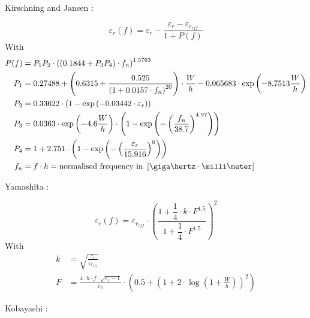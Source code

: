 \documentclass[10pt]{report}
\begin{document}
Kirschning and Jansen \cite{Kirschning3}:

\begin{equation}
\varepsilon_{r}(f) = \varepsilon_{r} - \frac{\varepsilon_{r} - \varepsilon_{r_{eff}}}{1 + P(f)}
\end{equation}
With
\begin{align}
P(f) &= P_{1} P_{2} \cdot\left(\left(0.1844 + P_{3} P_{4}\right) \cdot f_{n}\right)^{1.5763}\\
P_{1} &= 0.27488 + \left(0.6315 + \frac{0.525}{\left(1 + 0.0157\cdot f_{n}\right)^{20}}\right)\cdot \frac{W}{h} - 0.065683 \cdot \exp\left(-8.7513\dfrac{W}{h}\right)\\
P_{2} &= 0.33622\cdot \left(1 - \exp\left(-0.03442 \cdot \varepsilon_{r}\right)\right)\\
P_{3} &= 0.0363 \cdot \exp\left(-4.6\dfrac{W}{h}\right) \cdot \left(1 - \exp\left(- \left(\dfrac{f_{n}}{38.7}\right)^{4.97}\right)\right)\\
P_{4} &= 1 + 2.751 \cdot \left(1 - \exp\left(- \left(\frac{\varepsilon_{r}}{15.916}\right)^{8}\right)\right)\\
f_{n} &= f \cdot h = \text{normalised frequency in } \left[\giga\hertz \cdot \milli\meter\right]
\end{align}

Yamashita \cite{Yamashita}:

\begin{equation}
\varepsilon_{r}(f) = \varepsilon_{r_{eff}}\cdot \left(\frac{1 + \dfrac{1}{4}\cdot k\cdot F^{1.5}}{1 + \dfrac{1}{4}\cdot F^{1.5}}\right)^{2}
\end{equation}
With
\begin{align}
k &= \sqrt{\frac{\varepsilon_{r}}{\varepsilon_{r_{eff}}}}\\
F &= \frac{4\cdot h\cdot f\cdot \sqrt{\varepsilon_{r} - 1}}{c_{0}} \cdot \left(0.5 + \left(1 + 2 \cdot \log\left(1 + \frac{W}{h}\right)\right)^{2}\right)
\end{align}

Kobayashi \cite{Kobayashi}:
\end{document}
